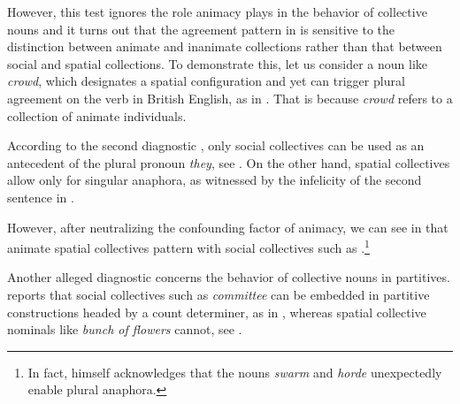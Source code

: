 \documentclass[output=paper]{langscibook}
\begin{document}
	\ea\label{wan:ex:agreement}
		\label{wan:ex:agreement-commitee}
		\label{wan:ex:agreement-bunch}
    \z
    \z

\noindent However, this test ignores the role animacy plays in the behavior of collective nouns \citep[see][Ch.~6]{de_vries2015shifting} and it turns out that the agreement pattern in  is sensitive to the distinction between animate and inanimate collections rather than that between social and spatial collections. To demonstrate this, let us consider a noun like \textit{crowd}, which designates a spatial configuration and yet can trigger plural agreement on the verb in British English, as in . That is because \textit{crowd} refers to a collection of animate individuals.

	\label{wan:ex:agreement-crowd}
    \z

\noindent According to the second diagnostic \citep[proposed by][]{henderson2017swarms}, only social collectives can be used as an antecedent of the plural pronoun \textit{they}, see . On the other hand, spatial collectives allow only for singular anaphora, as witnessed by the infelicity of the second sentence in .

	\ea\label{wan:ex:anaphora}
		\label{wan:ex:anaphora-committee}
		\label{wan:ex:anaphora-bouquet}
    \z
    \z

\noindent However, after neutralizing the confounding factor of animacy, we can see in  that animate spatial collectives pattern with social collectives such as .\footnote{In fact, \citeauthor{henderson2017swarms} himself acknowledges that the nouns \textit{swarm} and \textit{horde} unexpectedly enable plural anaphora.}

	\label{wan:ex:anaphora-crowd}
	\z

\noindent Another alleged diagnostic concerns the behavior of collective nouns in partitives. \citet{pearson2011new} reports that social collectives such as \textit{committee} can be embedded in partitive constructions headed by a count determiner, as in , whereas spatial collective nominals like \textit{bunch of flowers} cannot, see . 
\end{document}
